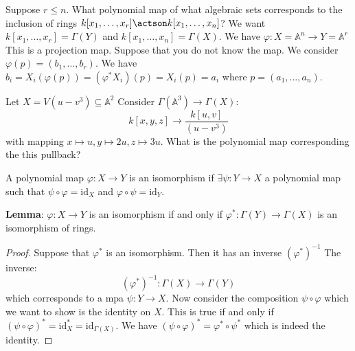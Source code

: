 \documentclass{report}
\begin{document}
\begin{examples}
    \begin{example}
        Suppose $r \leq n$. What polynomial map of what algebraic sets corresponds to the inclusion of rings $k[x_{1}, \ldots , x_{r}] \actson k[x_{1}, \ldots , x_{n}]$? We want $k[x_{1}, \ldots , x_{r}] = \Gamma(Y)$ and $k[x_{1}, \ldots , x_{n}] = \Gamma(X)$. We have $\varphi : X = \mathbb{A}^{n} \rightarrow Y = \mathbb{A}^{r}$ This is a projection map. Suppose that you do not know the map. We consider $\varphi(p) = (b_{1}, \ldots , b_{r})$. We have $b_{i} = X_{i}(\varphi(p))= (\varphi^{*}X_{i})(p) = X_{i}(p) = a_{i}$ where $p = (a_{1}, \ldots , a_{n})$.
    \end{example}
    \begin{example}
        Let $X = V(u - v^{3}) \subseteq \mathbb{A}^{2}$ Consider $\Gamma(\mathbb{A}^{3}) \rightarrow \Gamma(X)$:
            \begin{equation*}
                k[x, y, z] \rightarrow \dfrac{k[u, v]}{(u - v^{3})}
            \end{equation*}
        with mapping $x \mapsto u, y \mapsto 2u, z \mapsto 3u$. What is the polynomial map corresponding the this pullback?
    \end{example}
\end{examples}

\begin{definition}{}
    A polynomial map $\varphi : X \rightarrow Y$ is an isomorphism if $\exists  \psi : Y \rightarrow X$ a polynomial map such that $\psi \circ \varphi = \text{id}_{X}$ and $\varphi \circ \psi = \text{id}_{Y}$.
\end{definition}

\textbf{Lemma}: $\varphi : X \rightarrow Y$ is an isomorphism if and only if $\varphi^{*} : \Gamma(Y) \rightarrow \Gamma(X)$ is an isomorphism of rings.
    \begin{proof}
        Suppose that $\varphi^{*}$ is an isomorphism. Then it has an inverse $(\varphi^{*})^{-1}$ The inverse:
            \begin{equation*}
                (\varphi^{*})^{-1} : \Gamma(X) \rightarrow \Gamma(Y)
            \end{equation*}
        which corresponds to a mpa $\psi : Y \rightarrow X$. Now consider the composition $\psi \circ \varphi$ which we want to show is the identity on $X$. This is true if and only if $(\psi \circ \varphi)^{*} = \text{id}_{X}^{*} = \text{id}_{\Gamma(X)}$. We have $(\psi \circ \varphi)^{*} = \varphi^{*} \circ \psi^{*}$ which is indeed the identity.
    \end{proof}
\end{document}
